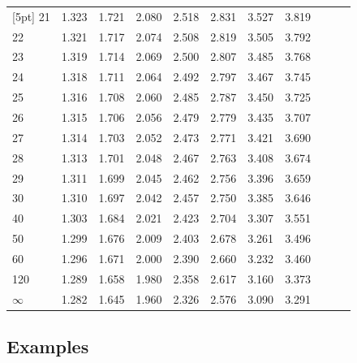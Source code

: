 \begin{frame}
{\begin{tabular}{l|ll>{\columncolor{blue}}llllllll}
[5pt]
21 & 1.323 & 1.721 & 2.080 & 2.518 & 2.831 & 3.527 & 3.819 \\ 
22 & 1.321 & 1.717 & 2.074 & 2.508 & 2.819 & 3.505 & 3.792 \\ 
23 & 1.319 & 1.714 & 2.069 & 2.500 & 2.807 & 3.485 & 3.768 \\ 
24 & 1.318 & 1.711 & 2.064 & 2.492 & 2.797 & 3.467 & 3.745 \\ 
25 & 1.316 & 1.708 & 2.060 & 2.485 & 2.787 & 3.450 & 3.725 \\ 
[5pt]
26 & 1.315 & 1.706 & 2.056 & 2.479 & 2.779 & 3.435 & 3.707 \\ 
27 & 1.314 & 1.703 & 2.052 & 2.473 & 2.771 & 3.421 & 3.690 \\ 
28 & 1.313 & 1.701 & 2.048 & 2.467 & 2.763 & 3.408 & 3.674 \\ 
29 & 1.311 & 1.699 & 2.045 & 2.462 & 2.756 & 3.396 & 3.659 \\ 
30 & 1.310 & 1.697 & 2.042 & 2.457 & 2.750 & 3.385 & 3.646 \\ 
[5pt]
40 & 1.303 & 1.684 & 2.021 & 2.423 & 2.704 & 3.307 & 3.551 \\ 
50 & 1.299 & 1.676 & 2.009 & 2.403 & 2.678 & 3.261 & 3.496 \\ 
60 & 1.296 & 1.671 & 2.000 & 2.390 & 2.660 & 3.232 & 3.460 \\ 
120 & 1.289 & 1.658 & 1.980 & 2.358 & 2.617 & 3.160 & 3.373 \\ 
$\infty$ & 1.282 & 1.645 & 1.960 & 2.326 & 2.576 & 3.090 & 3.291 
\end{tabular}


}

\end{frame}

\subsection{Examples}

